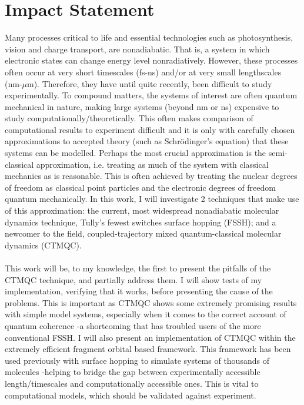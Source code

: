 \chapter*{Impact Statement}
Many processes critical to life and essential technologies such as photosynthesis, vision and charge transport, are nonadiabatic. That is, a system in which electronic states can change energy level nonradiatively. However, these processes often occur at very short timescales (fs-ns) and/or at very small lengthscales (nm-$\mu$m). Therefore, they have until quite recently, been difficult to study experimentally. To compound matters, the systems of interest are often quantum mechanical in nature, making large systems (beyond nm or ns) expensive to study computationally/theoretically. This often makes comparison of computational results to experiment difficult and it is only with carefully chosen approximations to accepted theory (such as Schr\"odinger's equation) that these systems can be modelled. Perhaps the most crucial approximation is the semi-classical approximation, i.e. treating as much of the system with classical mechanics as is reasonable. This is often achieved by treating the nuclear degrees of freedom as classical point particles and the electronic degrees of freedom quantum mechanically. In this work, I will investigate 2 techniques that make use of this approximation: the current, most widespread nonadiabatic molecular dynamics technique, Tully's fewest switches surface hopping (FSSH); and a newcomer to the field, coupled-trajectory mixed quantum-classical molecular dynamics (CTMQC).
\\\\
This work will be, to my knowledge, the first to present the pitfalls of the CTMQC technique, and partially address them. I will show tests of my implementation, verifying that it works, before presenting the cause of the problems. This is important as CTMQC shows some extremely promising results with simple model systems, especially when it comes to the correct account of quantum coherence -a shortcoming that has troubled users of the more conventional FSSH. I will also present an implementation of CTMQC within the extremely efficient fragment orbital based framework. This framework has been used previously with surface hopping to simulate systems of thousands of molecules -helping to bridge the gap between experimentally accessible length/timescales and computationally accessible ones. This is vital to computational models, which should be validated against experiment.
\\\\
